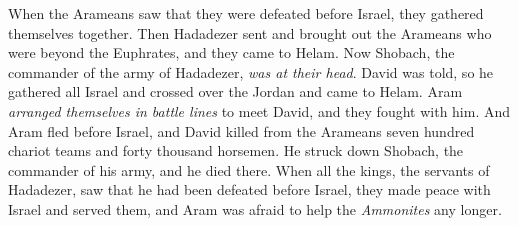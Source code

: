 \begin{biblechapter}
 When the Arameans saw that they were defeated before Israel, they gathered themselves together.
\verse Then Hadadezer sent and brought out the Arameans who were beyond the Euphrates, and they came to Helam. Now Shobach, the commander of the army of Hadadezer, \textit{was at their head}.
\verse David was told, so he gathered all Israel and crossed over the Jordan and came to Helam. Aram \textit{arranged themselves in battle lines} to meet David, and they fought with him.
\verse And Aram fled before Israel, and David killed from the Arameans seven hundred chariot teams and forty thousand horsemen. He struck down Shobach, the commander of his army, and he died there.
\verse When all the kings, the servants of Hadadezer, saw that he had been defeated before Israel, they made peace with Israel and served them, and Aram was afraid to help the \textit{Ammonites} any longer.
\end{biblechapter}

